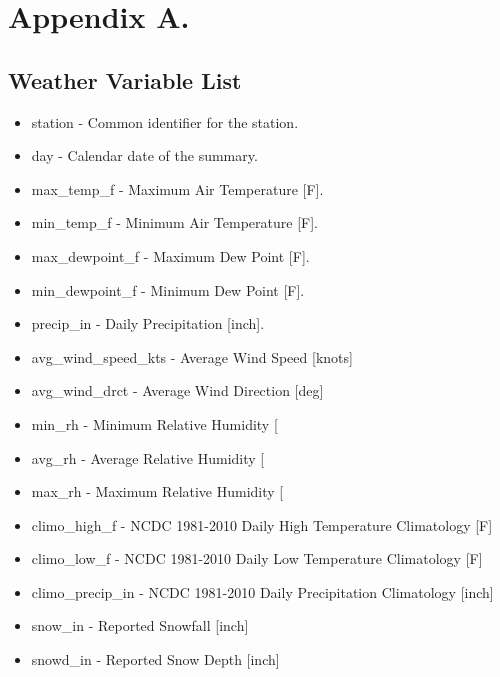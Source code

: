 \documentclass[twoside,11pt]{article}
\begin{document}



\appendix
\section*{Appendix A.}\label{append}
\subsection*{Weather Variable List} \label{weavarlist}
\begin{itemize}
	\item station - Common identifier for the station.
	\item day - Calendar date of the summary.
	\item max\_temp\_f - Maximum Air Temperature [F].
	\item min\_temp\_f - Minimum Air Temperature [F].
	\item max\_dewpoint\_f - Maximum Dew Point [F].
	\item min\_dewpoint\_f - Minimum Dew Point [F].
	\item precip\_in - Daily Precipitation [inch].
	\item avg\_wind\_speed\_kts - Average Wind Speed [knots]
	\item avg\_wind\_drct - Average Wind Direction [deg]
	\item min\_rh - Minimum Relative Humidity [%
	\item avg\_rh - Average Relative Humidity [%
	\item max\_rh - Maximum Relative Humidity [%
	\item climo\_high\_f - NCDC 1981-2010 Daily High Temperature Climatology [F]
	\item climo\_low\_f - NCDC 1981-2010 Daily Low Temperature Climatology [F]
	\item climo\_precip\_in - NCDC 1981-2010 Daily Precipitation Climatology [inch]
	\item snow\_in - Reported Snowfall [inch]
	\item snowd\_in - Reported Snow Depth [inch]
\end{itemize}
\end{document}
